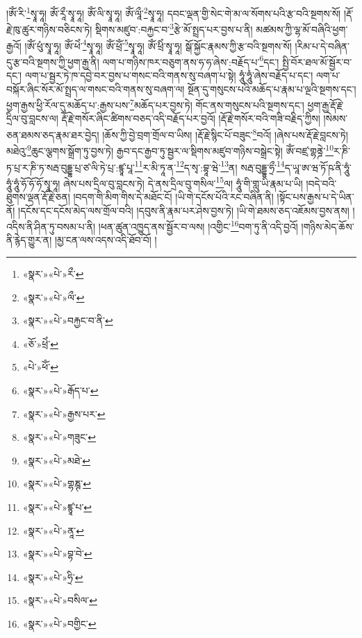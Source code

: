 །ཨོཾ་རི་\footnote{«སྣར་»«པེ་»རྀ་}སྭཱ་ཧཱ། ཨོཾ་རཱྀ་སྭཱ་ཧཱ། ཨོཾ་ལི་སྭཱ་ཧཱ། ཨོཾ་ལཱྀ་\footnote{«སྣར་»«པེ་»ལྀ་}སྭཱ་ཧཱ། དབང་ལྡན་གྱི་སེང་གེ་མ་ལ་སོགས་པའི་རྩ་བའི་སྔགས་སོ། །རྡོ་རྗེ་ཁུ་ཚུར་གཉིས་བཅིངས་ཏེ། སྡིགས་མཛུབ་:བརྐྱང་བ་\footnote{«སྣར་»«པེ་»བརྐྱང་བ་ནི་}རྩེ་མོ་སྤྲད་པར་བྱས་པ་ནི། མཚམས་ཀྱི་ལྷ་མོ་བཞིའི་ཕྱག་རྒྱའོ། །ཨོཾ་ཕུཾ་སྭཱ་ཧཱ། ཨོཾ་ཕེཾ་\footnote{«ཅོ་»ཕྲེཾ་}སྭཱ་ཧཱ། ཨོཾ་ཕྲོཾ་\footnote{«པེ་»ཕོཾ་}སྭཱ་ཧཱ། ཨོཾ་ཕྲིཾ་སྭཱ་ཧཱ། སྒོ་སྐྱོང་རྣམས་ཀྱི་རྩ་བའི་སྔགས་སོ། །རིམ་པ་དེ་བཞིན་དུ་རྩ་བའི་སྔགས་ཀྱི་ཕྱག་རྒྱ་ནི། ལག་པ་གཉིས་ཁར་བཅུག་ནས་ཧ་ཧ་ཞེས་:བརྗོད་པ་\footnote{«སྣར་»«པེ་»རྒོད་པ་}དང་། སྤྱི་བོར་ཐལ་མོ་སྦྱོར་བ་དང་། ལག་པ་སྦྱར་ཏེ་ཁ་དབྱེ་བར་བྱས་པ་གསང་བའི་གནས་སུ་བཞག་པ་སྟེ། ཧཱུཾ་ཧཱུཾ་ཞེས་བརྗོད་པ་དང་། ལག་པ་བསྐོར་ཞིང་སོར་མོ་སྤྲད་ལ་གསང་བའི་གནས་སུ་བཞག་ལ། སྔོན་དུ་གསུངས་པའི་མཆོད་པ་རྣམ་པ་ལྔའི་སྔགས་དང་། ཕྱག་རྒྱས་ཕྱི་རོལ་དུ་མཆོད་པ་:རྒྱས་པས་\footnote{«སྣར་»«པེ་»རྒྱས་པར་}མཆོད་པར་བྱས་ཏེ། གོང་ནས་གསུངས་པའི་སྔགས་དང་། ཕྱག་རྒྱ་རྡོ་རྗེ་དྲིལ་བུ་བླངས་ལ། རྡོ་རྗེ་གསོར་ཞིང་ཚིགས་བཅད་འདི་བརྗོད་པར་བྱའོ། །རྡོ་རྗེ་གསོར་བའི་གཟི་བརྗིད་ཀྱིས། །སེམས་ཅན་ཐམས་ཅད་རྣམ་ཐར་བྱེད། །ཆོས་ཀྱི་བྱེ་བྲག་གྲོལ་བ་ཡིས། །རྡོ་རྗེ་སྙིང་པོ་བཟུང་\footnote{«སྣར་»«པེ་»གཟུང་}བའོ། །ཞེས་པས་རྡོ་རྗེ་བླངས་ཏེ། མཐེའུ་\footnote{«སྣར་»«པེ་»མཐེ་}ཆུང་ལྕགས་སྒྲོག་ཏུ་བྱས་ཏེ། རྒྱབ་དང་རྒྱབ་ཏུ་སྦྱར་ལ་སྡིགས་མཛུབ་གཉིས་བསྒྲེང་སྟེ། ཨོཾ་བཛྲ་གྷནྜེ་\footnote{«སྣར་»«པེ་»གྷཎྚ་}ར་ཎི་ཏ་པྲ་ར་ཎི་ཏ་སརྦ་བུདྡྷ་པྲ་ཙ་ལི་ཏེ་པྲ་:ཛྙཱ་པཱ་\footnote{«སྣར་»«པེ་»ཛྙཱ་པ་}ར་མི་ཏཱ་ན་\footnote{«སྣར་»«པེ་»ནཱ་}ད་སྭ་:བྷཱ་ཝེ་\footnote{«སྣར་»«པེ་»བྷ་བེ་}ན། སརྦ་བུདྡྷ་ཧྲྀ་\footnote{«སྣར་»«པེ་»ཧྲི་}ད་ཡཱ་ཨ་ཝ་ཏོ་ཥ་ནི་ཧཱུཾ་ཧཱུཾ་ཧཱུཾ་ཧོ་ཧོ་ཧོ་སྭཱ་ཧཱ། ཞེས་པས་དྲིལ་བུ་བླངས་ཏེ། དེ་ནས་དྲིལ་བུ་གསིལ་\footnote{«སྣར་»«པེ་»བསིལ་}ལ། ཧཱུཾ་གི་གླུ་ཡི་རྣམ་པ་ཡི། །བདེ་བའི་ཐུགས་ལྡན་རྡོ་རྗེ་ཅན། །བདག་གི་མིག་གིས་དེ་མཐོང་ངོ། །ཡི་གེ་དངོས་པོའི་རང་བཞིན་ནི། །སྟོང་པས་རྒྱས་པ་དེ་ཡིན་ནོ། །དངོས་དང་དངོས་མེད་ལས་གྲོལ་བའི། །དབུས་ནི་རྣམ་པར་ཤེས་བྱས་ཏེ། །ཡི་གེ་ཐམས་ཅད་འཇོམས་བྱས་ནས། །འདིས་ནི་ཤིན་ཏུ་བསམ་པ་ནི། །ཕན་ཚུན་འཁྱུད་ནས་སྦྱོར་བ་ལས། །འགྱིང་\footnote{«སྣར་»«པེ་»བགྱིང་}བག་ཏུ་ནི་འདི་བྱའོ། །གཉིས་མེད་ཆོས་ནི་རྙེད་གྱུར་ན། །མྱ་ངན་ལས་འདས་འདི་ཐོབ་བོ། །
